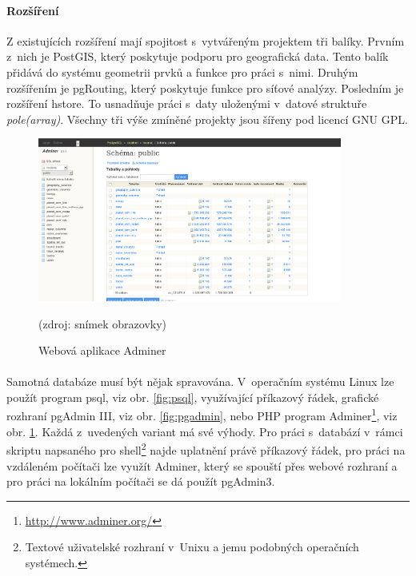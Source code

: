 \documentclass[11pt,a4paper,titlepage,oneside]{book}
\begin{document}
		\paragraph{Rozšíření}\label{par:rozsireni}Z existujících rozšíření mají spojitost s~vytvářeným projektem tři balíky. Prvním z~nich je PostGIS, který poskytuje podporu pro geografická data. Tento balík přidává do systému geometrii prvků a funkce pro práci s~nimi. Druhým rozšířením je pgRouting, který poskytuje funkce pro síťové analýzy. Posledním je rozšíření hstore. To usnadňuje práci s~daty uloženými v~datové struktuře \textit{pole(array)}. Všechny tři výše zmíněné projekty jsou šířeny pod licencí GNU \ac{GPL}.
		\begin{figure}[!h]
			\begin{center}
				\includegraphics[width=10cm]{obrazky/adminer.png}
				\caption{Webová aplikace Adminer}
				\label{fig:adminer}
				(zdroj: snímek obrazovky)
			\end{center}
		\end{figure}			



		\paragraph{}Samotná databáze musí být nějak spravována. V~operačním systému Linux lze použít program psql, viz obr. \ref{fig:psql}, využívající příkazový řádek, grafické rozhraní pgAdmin III, viz obr. \ref{fig:pgadmin}, nebo \ac{PHP} program Adminer\footnote{\url{http://www.adminer.org/}}, viz obr. \ref{fig:adminer}. Každá z~uvedených variant má své výhody. Pro práci s~databází v~rámci skriptu napsaného pro shell\footnote{Textové uživatelské rozhraní v~Unixu a jemu podobných operačních systémech.} najde uplatnění právě příkazový řádek, pro práci na vzdáleném počítači lze využít Adminer, který se spouští přes webové rozhraní a pro práci na lokálním počítači se dá použít pgAdmin3.
\end{document}
